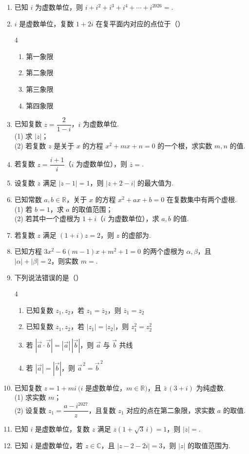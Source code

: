 \documentclass[UTF8,11pt]{ctexart}
\newcommand{\blank}{\underline{\hspace{2.8cm}}}
\newcommand{\fourchoices}[4]{%
  \begin{multicols}{4}
  \begin{enumerate}[label=\Alph*.,leftmargin=1.6em,itemsep=0pt,topsep=0pt]
  \item #1
  \item #2
  \item #3
  \item #4
  \end{enumerate}
  \end{multicols}
}
\begin{document}
\begin{enumerate}
\item 已知 $i$ 为虚数单位，则 $i+i^2+i^3+i^4+\cdots+i^{2026}=$\blank.

\item $i$ 是虚数单位，复数 $1+2i$ 在复平面内对应的点位于（\quad）\\
\fourchoices{第一象限}{第二象限}{第三象限}{第四象限}

\item 已知复数 $z=\dfrac2{1-i}$，$i$ 为虚数单位.\\
(1) 求 $|z|$；\\
(2) 若复数 $z$ 是关于 $x$ 的方程 $x^2+mx+n=0$ 的一个根，求实数 $m,n$ 的值.

\item 若复数 $z=\dfrac{i+1}{i}$（$i$ 为虚数单位），则 $\bar z=$\blank.

\item 设复数 $z$ 满足 $|z-1|=1$，则 $|z+2-i|$ 的最大值为\blank.

\item 已知常数 $a,b\in\mathbb R$，关于 $x$ 的方程 $x^2+ax+b=0$ 在复数集中有两个虚根.\\
(1) 若 $b=1$，求 $a$ 的取值范围；\\
(2) 若其中一个虚根为 $1+i$（$i$ 为虚数单位），求 $a,b$ 的值.

\item 若复数 $z$ 满足 $(1+i)z=2$，则 $z$ 的虚部为\blank.

\item 已知方程 $3x^2-6(m-1)x+m^2+1=0$ 的两个虚根为 $\alpha,\beta$，且 $|\alpha|+|\beta|=2$，则实数 $m=$\blank.

\item 下列说法错误的是（\quad）\\
\fourchoices{已知复数 $z_1,z_2$，若 $z_1=\bar z_2$，则 $\bar z_1=z_2$}{已知复数 $z_1,z_2$，若 $|z_1|=|z_2|$，则 $z_1^2=z_2^2$}{若 $|\vec a\cdot\vec b|=|\vec a|\,|\vec b|$，则 $\vec a$ 与 $\vec b$ 共线}{若 $|\vec a|=|\vec b|$，则 $\vec a^{\,2}=\vec b^{\,2}$}

\item 已知复数 $z=1+mi\ (i$ 是虚数单位，$m\in\mathbb R)$，且 $\bar z\,(3+i)$ 为纯虚数.\\
(1) 求实数 $m$；\\
(2) 设复数 $z_1=\dfrac{a-i^{2027}}{z}$，且复数 $z_1$ 对应的点在第二象限，求实数 $a$ 的取值.

\item 已知 $i$ 是虚数单位，复数 $z$ 满足 $z(1+\sqrt3\,i)=1$，则 $|z|=$\blank.

\item 已知 $i$ 是虚数单位，若 $z\in\mathbb C$，且 $|z-2-2i|=3$，则 $|z|$ 的取值范围为\blank.
\end{enumerate}
\end{document}
